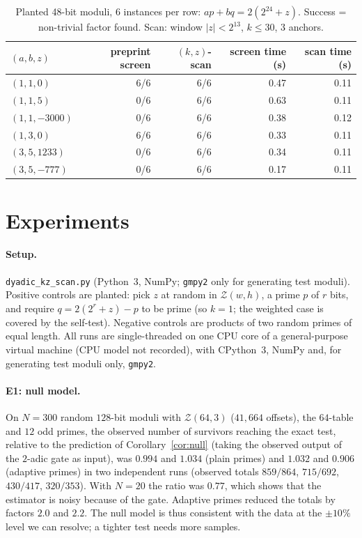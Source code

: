 \documentclass[11pt,a4paper]{article}
\newcommand{\code}[1]{\texttt{#1}}
\begin{document}
\begin{table}[ht]\centering\small
\caption{Planted 48-bit moduli, 6 instances per row: $ap+bq=2(2^{24}+z)$. Success = non-trivial factor found. Scan: window $|z|<2^{13}$, $k\le30$, 3 anchors.}\label{tab:v5}
\begin{tabular}{@{}lrrrr@{}}\toprule
$(a,b,z)$ & preprint screen & $(k,z)$-scan & screen time (s) & scan time (s)\\\midrule
$(1,1,0)$ & 6/6 & 6/6 & 0.47 & 0.11\\
$(1,1,5)$ & 0/6 & 6/6 & 0.63 & 0.11\\
$(1,1,-3000)$ & 0/6 & 6/6 & 0.38 & 0.12\\
$(1,3,0)$ & 6/6 & 6/6 & 0.33 & 0.11\\
$(3,5,1233)$ & 0/6 & 6/6 & 0.34 & 0.11\\
$(3,5,-777)$ & 0/6 & 6/6 & 0.17 & 0.11\\\bottomrule
\end{tabular}
\end{table}

\section{Experiments}\label{sec:exp}
\paragraph{Setup.} \code{dyadic\_kz\_scan.py} (Python~3, NumPy; \code{gmpy2} only for generating test moduli). Positive controls are planted: pick $z$ at random in $\mathcal Z(w,h)$, a prime $p$ of $r$ bits, and require $q=2(2^r+z)-p$ to be prime (so $k=1$; the weighted case is covered by the self-test). Negative controls are products of two random primes of equal length. All runs are single-threaded on one CPU core of a general-purpose virtual machine (CPU model not recorded), with CPython~3, NumPy and, for generating test moduli only, \code{gmpy2}.

\paragraph{E1: null model.} On $N=300$ random $128$-bit moduli with $\mathcal Z(64,3)$ ($41{,}664$ offsets), the $64$-table and $12$ odd primes, the observed number of survivors reaching the exact test, relative to the prediction of Corollary~\ref{cor:null} (taking the observed output of the $2$-adic gate as input), was $0.994$ and $1.034$ (plain primes) and $1.032$ and $0.906$ (adaptive primes) in two independent runs (observed totals $859/864$, $715/692$, $430/417$, $320/353$). With $N=20$ the ratio was $0.77$, which shows that the estimator is noisy because of the gate. Adaptive primes reduced the totals by factors $2.0$ and $2.2$. The null model is thus consistent with the data at the $\pm10\%$ level we can resolve; a tighter test needs more samples.
\end{document}
